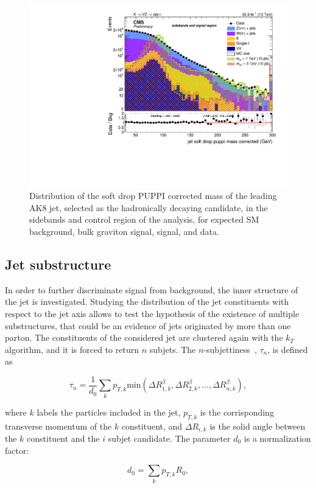 \begin{figure}[!htb]
  \begin{center}
    \includegraphics[width=.495\textwidth]{figures/FatJet1_softdropPuppiMassCorr.pdf}
  \end{center}
  \caption{Distribution of the soft drop PUPPI corrected mass of the leading AK8 jet, selected as the hadronically decaying \V candidate, in the sidebands and control region of the analysis, for expected SM background, bulk graviton signal, \Wp signal, and data.}
  \label{fig:mj_paper}
\end{figure}


\subsection{Jet substructure}\label{ssec:jetsub}

In order to further discriminate signal from background, the inner structure of the jet is investigated. Studying the distribution of the jet constituents with respect to the jet axis allows to test the hypothesis of the existence of multiple substructures, that could be an evidence of jets originated by more than one parton. The constituents of the considered jet are clustered again with the $k_T$ algorithm, and it is forced to return $n$ subjets. The $n$-subjettiness~\cite{Thaler2011}, $\tau_n$, is defined as

\begin{equation}
\tau_n = \frac{1}{d_0} \sum_k p_{T,k} \text{min} \left( \Delta R_{1,k}^\beta, \Delta R_{2,k}^\beta, \dots, \Delta R_{n,k}^\beta \right),
\label{eq:n_subjettiness_def}
\end{equation}

\noindent where $k$ labels the particles included in the jet, $p_{T,k}$ is the corrisponding transverse momentum of the $k$ constituent, and $\Delta R_{i,k}$ is the solid angle between the $k$ constituent and the $i$ subjet candidate. The parameter $d_0$ is a normalization factor:

\begin{equation}
d_0 = \sum_k p_{T,k} R_0,
\label{eq:n_subjettiness_d0}
\end{equation}

